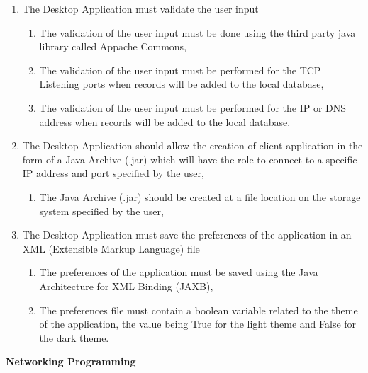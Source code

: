 \begin{enumerate}
    \item The Desktop Application must validate the user input
    \begin{enumerate}
        \item The validation of the user input must be done using the third party java library called
              Appache Commons,
        \item The validation of the user input must be performed for the TCP Listening ports when
              records will be added to the local database,
        \item The validation of the user input must be performed for the IP or DNS address when
              records will be added to the local database.
    \end{enumerate}
    \item The Desktop Application should allow the creation of client application in the form of a Java Archive
          (.jar) which will have the role to connect to a specific IP address and port specified by the user,
    \begin{enumerate}
        \item The Java Archive (.jar) should be created at a file location on the storage system specified
              by the user,
    \end{enumerate}
    \item The Desktop Application must save the preferences of the application in an XML
          (Extensible Markup Language) file
    \begin{enumerate}
        \item The preferences of the application must be saved using the Java Architecture for XML Binding (JAXB),
        \item The preferences file must contain a boolean variable related to the theme of the application,
              the value being True for the light theme and False for the dark theme.
    \end{enumerate}
\end{enumerate}

\newpage

\noindent
\textbf{Networking Programming}

